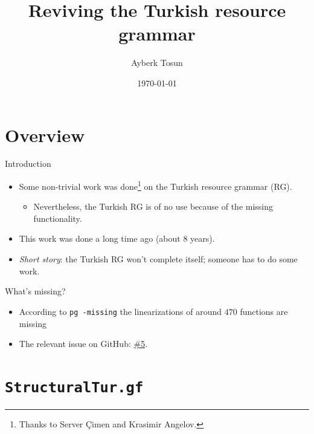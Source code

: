 \documentclass{beamer}
\title{Reviving the Turkish resource grammar}
\date{\today}
\author{Ayberk Tosun}
\institute{Fifth GF Summer School}
\newcommand{\issuelink}{https://github.com/GrammaticalFramework/GF/issues/5}
\begin{document}
  \maketitle

  \section{Overview}

  \begin{frame}{Introduction}
    \begin{itemize}
      \item<1-> Some non-trivial work was done\footnote{Thanks to Server
        \c{C}imen and Krasimir Angelov.} on the Turkish resource grammar (RG).
        \begin{itemize}
          \item<2-> Nevertheless, the Turkish RG is of no use
            because of the missing functionality.
        \end{itemize}
      \item<3-> This work was done a long time ago (about $8$ years).
      \item<4-> \emph{Short story}: the Turkish RG won't complete
        itself; someone has to do some work.
    \end{itemize}
  \end{frame}

  \begin{frame}{What's missing?}
    \begin{itemize}
      \item<1-> According to \texttt{pg -missing} the linearizations of around
        $470$ functions are missing
      \item<2-> The relevant issue on GitHub: \href{\issuelink}{\alert{\#5}}.
    \end{itemize}
  \end{frame}

  \section{\texttt{StructuralTur.gf}}
\end{document}
